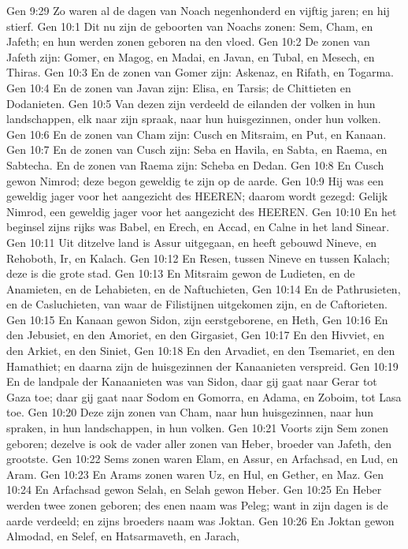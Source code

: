 Gen 9:29  Zo waren al de dagen van Noach negenhonderd en vijftig jaren; en hij stierf.
Gen 10:1  Dit nu zijn de geboorten van Noachs zonen: Sem, Cham, en Jafeth; en hun werden zonen geboren na den vloed.
Gen 10:2  De zonen van Jafeth zijn: Gomer, en Magog, en Madai, en Javan, en Tubal, en Mesech, en Thiras.
Gen 10:3  En de zonen van Gomer zijn: Askenaz, en Rifath, en Togarma.
Gen 10:4  En de zonen van Javan zijn: Elisa, en Tarsis; de Chittieten en Dodanieten.
Gen 10:5  Van dezen zijn verdeeld de eilanden der volken in hun landschappen, elk naar zijn spraak, naar hun huisgezinnen, onder hun volken.
Gen 10:6  En de zonen van Cham zijn: Cusch en Mitsraim, en Put, en Kanaan.
Gen 10:7  En de zonen van Cusch zijn: Seba en Havila, en Sabta, en Raema, en Sabtecha. En de zonen van Raema zijn: Scheba en Dedan.
Gen 10:8  En Cusch gewon Nimrod; deze begon geweldig te zijn op de aarde.
Gen 10:9  Hij was een geweldig jager voor het aangezicht des HEEREN; daarom wordt gezegd: Gelijk Nimrod, een geweldig jager voor het aangezicht des HEEREN.
Gen 10:10  En het beginsel zijns rijks was Babel, en Erech, en Accad, en Calne in het land Sinear.
Gen 10:11  Uit ditzelve land is Assur uitgegaan, en heeft gebouwd Nineve, en Rehoboth, Ir, en Kalach.
Gen 10:12  En Resen, tussen Nineve en tussen Kalach; deze is die grote stad.
Gen 10:13  En Mitsraim gewon de Ludieten, en de Anamieten, en de Lehabieten, en de Naftuchieten,
Gen 10:14  En de Pathrusieten, en de Casluchieten, van waar de Filistijnen uitgekomen zijn, en de Caftorieten.
Gen 10:15  En Kanaan gewon Sidon, zijn eerstgeborene, en Heth,
Gen 10:16  En den Jebusiet, en den Amoriet, en den Girgasiet,
Gen 10:17  En den Hivviet, en den Arkiet, en den Siniet,
Gen 10:18  En den Arvadiet, en den Tsemariet, en den Hamathiet; en daarna zijn de huisgezinnen der Kanaanieten verspreid.
Gen 10:19  En de landpale der Kanaanieten was van Sidon, daar gij gaat naar Gerar tot Gaza toe; daar gij gaat naar Sodom en Gomorra, en Adama, en Zoboim, tot Lasa toe.
Gen 10:20  Deze zijn zonen van Cham, naar hun huisgezinnen, naar hun spraken, in hun landschappen, in hun volken.
Gen 10:21  Voorts zijn Sem zonen geboren; dezelve is ook de vader aller zonen van Heber, broeder van Jafeth, den grootste.
Gen 10:22  Sems zonen waren Elam, en Assur, en Arfachsad, en Lud, en Aram.
Gen 10:23  En Arams zonen waren Uz, en Hul, en Gether, en Maz.
Gen 10:24  En Arfachsad gewon Selah, en Selah gewon Heber.
Gen 10:25  En Heber werden twee zonen geboren; des enen naam was Peleg; want in zijn dagen is de aarde verdeeld; en zijns broeders naam was Joktan.
Gen 10:26  En Joktan gewon Almodad, en Selef, en Hatsarmaveth, en Jarach,
